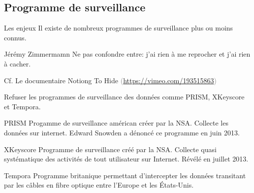 \documentclass[aspectratio=169]{beamer}
\begin{document}
\subsection{Programme de surveillance}

\begin{frame}
\begin{center}
\large{\color{cvp}{Programme de surveillance}}
\end{center}
\end{frame}

\begin{frame}{Les enjeux}
Il existe de nombreux programmes de surveillance plus ou moins connus.
\begin{block}{Jérémy Zimmermamn}
Ne pas confondre entre: j'ai rien à me reprocher et j'ai rien à cacher.
\end{block}
Cf. Le documentaire Notiong To Hide \textcolor{gray}{\tiny{(\url{https://vimeo.com/193515863})}}
\end{frame}

\begin{frame}{}
Refuser les programmes de surveillance des données comme PRISM, XKeyscore et Tempora.

\begin{tiny}
\begin{block}{PRISM}
Progamme de surveillance américan créer par la NSA. Collecte les données sur internet.
Edward Snowden a dénoncé ce programme en juin 2013.
\end{block}

\begin{block}{XKeyscore}
Programme de surveillance créé par la NSA. Collecte quasi systématique des activités de tout utilisateur sur Internet. Révélé en juillet 2013.
\end{block}

\begin{block}{Tempora}
Programme britanique permettant d'intercepter les données transitant par les câbles en fibre optique entre l'Europe et les États-Unis.
\end{block}
\end{tiny}
\end{frame}
\end{document}
